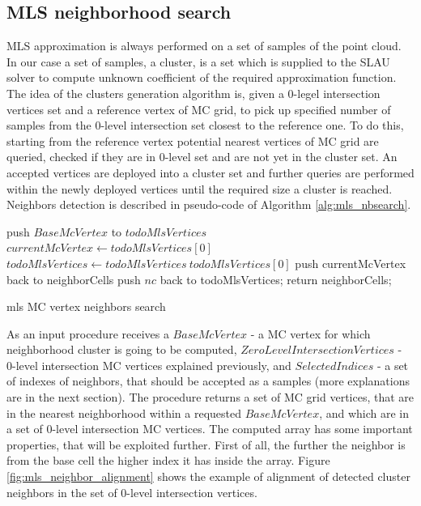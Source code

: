 \subsection{MLS neighborhood search}
MLS approximation is always performed on a set of samples of the point cloud. In our case a set of samples, a cluster, is a set which is supplied to the SLAU solver to compute unknown coefficient of the required approximation function. The idea of the clusters generation algorithm is, given a 0-legel intersection vertices set and a reference vertex of MC grid, to pick up specified number of samples from the 0-level intersection set closest to the reference one. To do this, starting from the reference vertex potential nearest vertices of MC grid are queried, checked if they are in 0-level set and are not yet in the cluster set. An accepted vertices are deployed into a cluster set and further queries are performed within the newly deployed vertices until the required size a cluster is reached.
Neighbors detection is described in pseudo-code of Algorithm \ref{alg:mls_nbsearch}.
\begin{algorithm}[H]
	\scriptsize
	\begin{algorithmic}
		\State push $BaseMcVertex$ to $todoMlsVertices$
			\State $currentMcVertex \gets todoMlsVertices[0]$
			\State $todoMlsVertices \gets todoMlsVertices \ todoMlsVertices[0]$
				\State push currentMcVertex back to neighborCells
			\EndIf
					\State push $nc$ back to todoMlsVertices;
				\EndIf
			\EndFor
		\EndWhile
		\State return neighborCells;
	\end{algorithmic}
	\caption{mls MC vertex neighbors search}
	\label{alg:mls_nbsearch}
\end{algorithm}
As an input procedure receives a $BaseMcVertex$ - a MC vertex for which neighborhood cluster is going to be computed, $ZeroLevelIntersectionVertices$ - 0-level intersection MC vertices explained previously, and $SelectedIndices$ - a set of indexes of neighbors, that should be accepted as a samples (more explanations are in the next section). The procedure returns a set of MC grid vertices, that are in the nearest neighborhood within a requested $BaseMcVertex$, and which are in a set of 0-level intersection MC vertices. The computed array has some important properties, that will be exploited further. First of all, the further the neighbor is from the base cell the higher index it has inside the array. Figure \ref{fig:mls_neighbor_alignment} shows the example of alignment of detected cluster neighbors in the set of 0-level intersection vertices.\\
